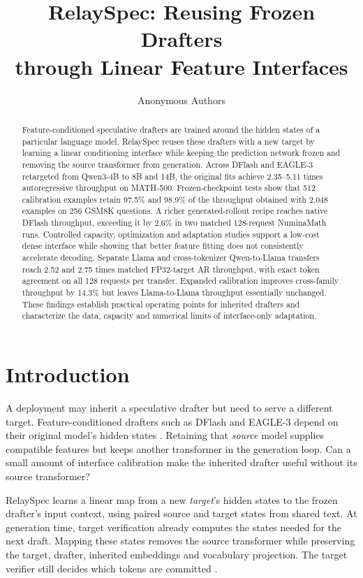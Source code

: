 \documentclass{article}
\title{RelaySpec: Reusing Frozen Drafters\\through Linear Feature Interfaces}
\author{Anonymous Authors}
\begin{document}
\maketitle

\begin{abstract}
Feature-conditioned speculative drafters are trained around the hidden
states of a particular language model. RelaySpec reuses these drafters
with a new target by learning a linear conditioning interface while
keeping the prediction network frozen and removing the source transformer
from generation. Across DFlash and EAGLE-3 retargeted from Qwen3-4B to 8B
and 14B, the original fits achieve 2.35--5.11 times autoregressive
throughput on MATH-500. Frozen-checkpoint tests show that 512 calibration
examples retain 97.5\% and 98.9\% of the throughput obtained with 2,048
examples on 256 GSM8K questions. A richer generated-rollout recipe reaches
native DFlash throughput, exceeding it by 2.6\% in two matched 128-request
NuminaMath runs. Controlled capacity, optimization and adaptation studies
support a low-cost dense interface while showing that better feature
fitting does not consistently accelerate decoding. Separate Llama and
cross-tokenizer Qwen-to-Llama transfers reach 2.52 and 2.75 times matched
FP32-target AR throughput, with exact token agreement on all 128 requests
per transfer. Expanded calibration improves cross-family throughput by
14.3\% but leaves Llama-to-Llama throughput essentially unchanged.
These findings establish practical operating points for inherited
drafters and characterize the data, capacity and numerical limits of
interface-only adaptation.
\end{abstract}

\section{Introduction}
\label{sec:introduction}

A deployment may inherit a speculative drafter but need to serve a
different target. Feature-conditioned drafters such as DFlash and
EAGLE-3 depend on their original model's hidden states
\citep{chen2026dflash,li2025eagle3}. Retaining that \emph{source} model
supplies compatible features but keeps another transformer in the
generation loop. Can a small amount of interface calibration make the
inherited drafter useful without its source transformer?

RelaySpec learns a linear map from a new \emph{target}'s hidden states
to the frozen drafter's input context, using paired source and target
states from shared text. At generation time, target verification already
computes the states needed for the next draft. Mapping these states
removes the source transformer while preserving the target, drafter,
inherited embeddings and vocabulary projection. The target verifier
still decides which tokens are committed \citep{leviathan2023speculative}.
\end{document}
